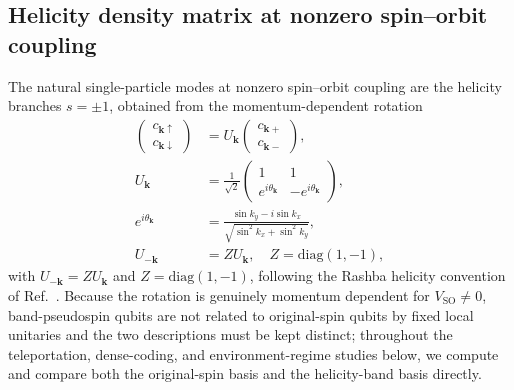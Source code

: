 \documentclass[aps,prb,twocolumn,superscriptaddress,longbibliography]{revtex4-2}
\begin{document}
\subsection{Helicity density matrix at nonzero spin--orbit coupling}
\label{sec:helicity_dm}

The natural single-particle modes at nonzero spin--orbit coupling are
the helicity branches $s=\pm1$, obtained from the momentum-dependent
rotation
%
\begin{equation}\boxed{\begin{aligned}
\begin{pmatrix}
c_{\mathbf{k}\uparrow}\\
c_{\mathbf{k}\downarrow}
\end{pmatrix}
&=
U_{\mathbf{k}}
\begin{pmatrix}
c_{\mathbf{k}+}\\
c_{\mathbf{k}-}
\end{pmatrix},
\\
U_{\mathbf{k}}
&=
\frac{1}{\sqrt{2}}
\begin{pmatrix}
1 & 1\\
e^{i\theta_{\mathbf{k}}} & -e^{i\theta_{\mathbf{k}}}
\end{pmatrix},\\
e^{i\theta_{\mathbf{k}}}
&=
\frac{\sin k_{y}-i\sin k_{x}}{\sqrt{\sin^{2}k_{x}+\sin^{2}k_{y}}},
\\
U_{-\mathbf{k}}&=ZU_{\mathbf{k}},
\quad Z=\mathrm{diag}(1,-1),
\end{aligned}}\label{eq:helicity_transform}\end{equation}
%
with $U_{-\mathbf{k}}=ZU_{\mathbf{k}}$ and
$Z=\mathrm{diag}(1,-1)$, following the Rashba helicity convention of
Ref.~\cite{Hutchinson2018}. Because the rotation is genuinely momentum
dependent for $V_{\mathrm{SO}}\neq0$, band-pseudospin qubits are not
related to original-spin qubits by fixed local unitaries and the two
descriptions must be kept distinct; throughout the teleportation,
dense-coding, and environment-regime studies below, we compute and
compare both the original-spin basis and the helicity-band basis directly.
\end{document}
